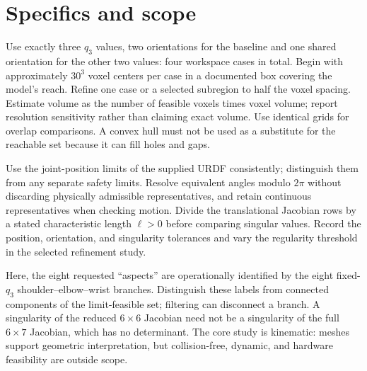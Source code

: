 \documentclass[11pt,a4paper]{article}
\begin{document}
\newpage
\section*{Specifics and scope}
Use exactly three $q_3$ values, two orientations for the baseline and one
shared orientation for the other two values: four workspace cases in total.
Begin with approximately $30^3$ voxel centers per case in a documented box
covering the model's reach. Refine one case or a selected subregion to half
the voxel spacing. Estimate volume as the number of feasible voxels times
voxel volume; report resolution sensitivity rather than claiming exact volume.
Use identical grids for overlap comparisons. A convex hull must not be used
as a substitute for the reachable set because it can fill holes and gaps.

Use the joint-position limits of the supplied URDF consistently; distinguish
them from any separate safety limits. Resolve equivalent angles modulo $2\pi$
without discarding physically admissible representatives, and retain continuous
representatives when checking motion. Divide the translational Jacobian rows
by a stated characteristic length $\ell>0$ before comparing singular values. Record
the position, orientation, and singularity tolerances and vary the regularity
threshold in the selected refinement study.

Here, the eight requested ``aspects'' are operationally identified by the
eight fixed-$q_3$ shoulder--elbow--wrist branches. Distinguish these labels from
connected components of the limit-feasible set; filtering can disconnect a
branch. A singularity of the reduced $6\times6$ Jacobian need not be a
singularity of the full $6\times7$ Jacobian, which has no determinant.
The core study is kinematic: meshes support geometric interpretation, but
collision-free, dynamic, and hardware feasibility are outside scope.
\end{document}
